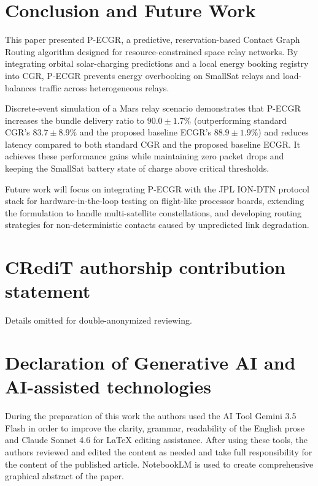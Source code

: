 \documentclass[a4paper,fleqn]{cas-dc}
\newcommand{\ecgr}{\textsf{ECGR}}
\newcommand{\pecgr}{\textsf{P-ECGR}}
\begin{document}
\section{Conclusion and Future Work}
\label{sec:conclusion}

This paper presented \pecgr{}, a predictive, reservation-based Contact Graph Routing algorithm designed for resource-constrained space relay networks. By integrating orbital solar-charging predictions and a local energy booking registry into CGR, \pecgr{} prevents energy overbooking on SmallSat relays and load-balances traffic across heterogeneous relays.

Discrete-event simulation of a Mars relay scenario demonstrates that \pecgr{} increases the bundle delivery ratio to $90.0 \pm 1.7\%$ (outperforming standard CGR's $83.7 \pm 8.9\%$ and the proposed baseline \ecgr{}'s $88.9 \pm 1.9\%$) and reduces latency compared to both standard CGR and the proposed baseline \ecgr{}. It achieves these performance gains while maintaining zero packet drops and keeping the SmallSat battery state of charge above critical thresholds.

Future work will focus on integrating \pecgr{} with the JPL ION-DTN protocol stack for hardware-in-the-loop testing on flight-like processor boards, extending the formulation to handle multi-satellite constellations, and developing routing strategies for non-deterministic contacts caused by unpredicted link degradation.

\section*{CRediT authorship contribution statement}
Details omitted for double-anonymized reviewing.

\section*{Declaration of Generative AI and AI-assisted technologies}
During the preparation of this work the authors used the AI Tool Gemini 3.5 Flash in order to improve the clarity, grammar, readability of the English prose and Claude Sonnet 4.6 for LaTeX editing assistance. After using these tools, the authors reviewed and edited the content as needed and take full responsibility for the content of the published article. NotebookLM is used to create comprehensive graphical abstract of the paper.
\end{document}
